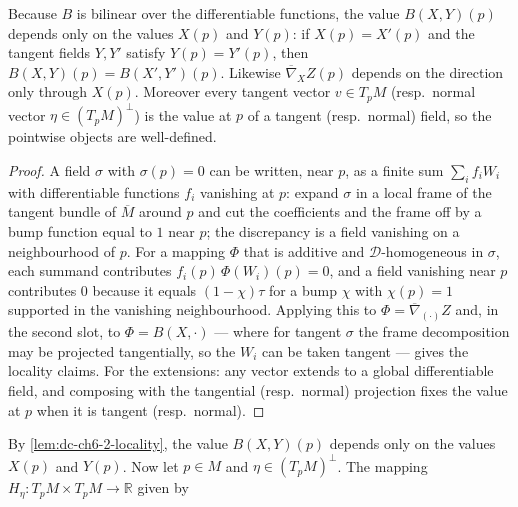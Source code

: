 \begin{lemma}
  \label{lem:dc-ch6-2-locality}
  \leanok
  Because $B$ is bilinear over the differentiable functions, the value
  $B(X,Y)(p)$ depends only on the values $X(p)$ and $Y(p)$: if $X(p)=X'(p)$ and
  the tangent fields $Y,Y'$ satisfy $Y(p)=Y'(p)$, then
  $B(X,Y)(p)=B(X',Y')(p)$. Likewise $\overline{\nabla}_XZ(p)$ depends on the
  direction only through $X(p)$. Moreover every tangent vector $v\in T_pM$
  (resp.\ normal vector $\eta\in(T_pM)^\perp$) is the value at $p$ of a tangent
  (resp.\ normal) field, so the pointwise objects are
  well-defined.
\end{lemma}
\begin{proof}
  \leanok
  \sketch
  A field $\sigma$ with $\sigma(p)=0$ can be written, near $p$, as a finite sum
  $\sum_i f_i W_i$ with differentiable functions $f_i$ vanishing at $p$: expand
  $\sigma$ in a local frame of the tangent bundle of $\overline{M}$ around $p$
  and cut the coefficients and the frame off by a bump function equal to $1$
  near $p$; the discrepancy is a field vanishing on a neighbourhood of $p$.
  For a mapping $\Phi$ that is additive and $\mathcal{D}$-homogeneous in
  $\sigma$, each summand contributes $f_i(p)\,\Phi(W_i)(p)=0$, and a field
  vanishing near $p$ contributes $0$ because it equals $(1-\chi)\tau$ for a
  bump $\chi$ with $\chi(p)=1$ supported in the vanishing neighbourhood.
  Applying this to $\Phi=\overline{\nabla}_{(\cdot)}Z$ and, in the second slot,
  to $\Phi=B(X,\cdot)$ — where for tangent $\sigma$ the frame decomposition
  may be projected tangentially, so the $W_i$ can be taken tangent — gives the
  locality claims. For the extensions: any vector extends to a global
  differentiable field, and composing with the tangential (resp.\ normal)
  projection fixes the value at $p$ when it is tangent (resp.\ normal).
\end{proof}

By \cref{lem:dc-ch6-2-locality}, the value $B(X,Y)(p)$ depends only on the
values $X(p)$ and $Y(p)$. Now let $p\in M$ and $\eta\in(T_pM)^\perp$. The
mapping $H_\eta:T_pM\times T_pM\to\mathbb{R}$ given by

